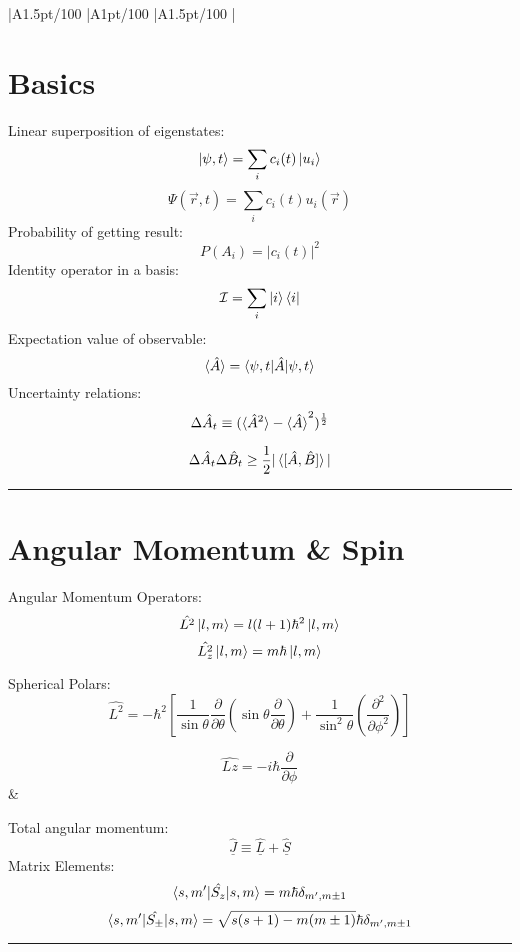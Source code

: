\documentclass[table,cmyk]{article}
\makeatletter
\newcommand\ratio[2]{\strip@pt\dimexpr#1pt/#2\relax}
\makeatother
\begin{document}
\begin{longtable}
{
    |A{1.5}{\ratio{30}{100}}%
    |A{1}{\ratio{30}{100}}%
    |A{1.5}{\ratio{30}{100}}%
    |%
}\hline
\section*{Basics}
Linear superposition of eigenstates:
\[
\ket{\psi,t} = \sum_{i} c_i(t)\ket{u_i}
\]
\[
\Psi(\vec{r},t) = \sum_{i} c_i(t)u_i(\vec{r})
\]
Probability of getting result:
\[
P(A_i) = |c_i(t)|^2\]
Identity operator in a basis:
  \[
  \mathcal{I}=\sum_{i}\ket{i}\bra{i}
  \]  
Expectation value of observable:
\[\braket{\hat{A}} = \braket{\psi, t|\hat{A}|\psi, t}\]
Uncertainty relations:
\[\Delta\hat{A}_t \equiv (\braket{\hat{A}^2} - \braket{\hat{A}}^2)^{\frac{1}{2}}\]

\[\Delta\hat{A}_t\Delta\hat{B}_t \ge \frac{1}{2} |\braket{[ \hat{A},\hat{B} ]}|\]


\noindent\rule{7.8cm}{0.4pt}
\section*{Angular Momentum \& Spin}
Angular Momentum Operators:
\[
\hat{L^2}\ket{l,m} = l(l+1)\hbar^2\ket{l,m}
\]
\[\hat{L^2_z} \ket{l,m} = m\hbar\ket{l,m}\]

Spherical Polars:
\[ \hat{L^2} = -\hbar^2\left[\frac{1}{\sin{\theta}} \frac{\partial}{\partial\theta}\left(\sin{\theta}\frac{\partial}{\partial\theta}\right)+\frac{1}{\sin^2{\theta}} \left( \frac{\partial^2}{\partial\phi^2}\right) \right] \]

\[ \hat{Lz} = -i\hbar\frac{\partial}{\partial\phi}\]
&
\vspace{0.3cm}

Total angular momentum:
\[ \hat{\underline{J}} \equiv \hat{\underline{L}}+\hat{\underline{S}}\]
Matrix Elements:
\[\braket{s,m'|\hat{S_z}|s,m} = m\hbar \delta_{m',m\pm1}\]
\[\braket{s,m'|\hat{S_{\pm}}|s,m} = \sqrt{s(s+1)-m(m\pm1)} \hbar \delta_{m',m\pm1}\]
\noindent\rule{7.8cm}{0.4pt}

\end{longtable}
\end{document}
